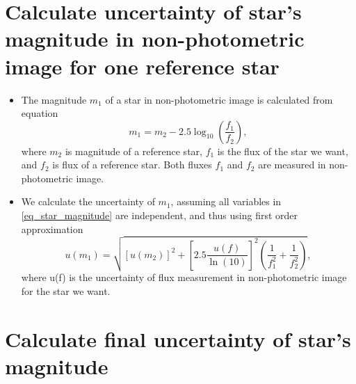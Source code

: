 \section{Calculate uncertainty of star’s magnitude in non-photometric image for one reference star}

\begin{itemize}
  \item The magnitude $m_1$ of a star in non-photometric image is calculated from equation
  \begin{equation}
  m_1 = m_2 - 2.5 \log_{10} \left( \frac{f_1}{f_2} \right),
  \label{eq_star_magnitude}
  \end{equation}
  where $m_2$ is magnitude of a reference star, $f_1$ is the flux of the star we want, and $f_2$ is flux of a reference star. Both fluxes $f_1$ and $f_2$ are measured in non-photometric image. 
  
  \item We calculate the uncertainty of $m_1$, assuming all variables in \autoref{eq_star_magnitude} are independent, and thus using first order approximation 
  \begin{equation}
  u(m_1) = \sqrt{[u(m_2)]^2 + \left[ 2.5 \frac{u(f)}{\ln(10)} \right]^2 \left( \frac{1}{f_1^2} + \frac{1}{f_2^2} \right)},
  \label{eq_uncertainty_of_magnitude}
  \end{equation}
  where u(f) is the uncertainty of flux measurement in non-photometric image for the star we want.

\end{itemize}


\section{Calculate final uncertainty of star's magnitude}

